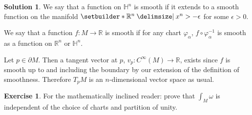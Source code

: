 \documentclass[11pt, a4paper]{report}
\theoremstyle{definition}
\newtheorem{ex}{Exercise}[part]
\newtheorem{sol}{Solution}[part]
\begin{document}
\begin{sol}

We say that a function on $\mathbb{H}^n$ is smooth if it extends to a smooth function on the manifold $\setbuilder*{\mathbb{R}^n \given x^n > -\epsilon}$ for some $\epsilon > 0$.

We say that a function $f: M \to \mathbb{R}$ is smooth if for any chart $\varphi_\alpha$, $f \circ \varphi_\alpha^{-1}$ is smooth as a function on $\mathbb{R}^n$ or $\mathbb{H}^n$.

Let $p \in \partial M$. Then a tangent vector at $p$, $v_p: C^\infty(M) \to \mathbb{R}$, exists since $f$ is smooth up to and including the boundary by our extension of the definition of smoothness. Therefore $T_p M$ is an $n$-dimensional vector space as usual.

\end{sol}

\begin{ex}

For the mathematically inclined reader: prove that $\int_M \omega$ is independent of the choice of charts and partition of unity.

\end{ex}
\end{document}
